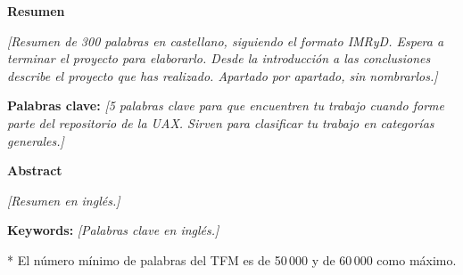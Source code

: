 \cleardoublepage
\thispagestyle{fancy}
{}

\begin{center}\huge \textbf{Resumen}\end{center}

\vspace{1em}

\textit{[Resumen de 300 palabras en castellano, siguiendo el formato IMRyD. Espera a terminar el proyecto para elaborarlo. Desde la introducción a las conclusiones describe el proyecto que has realizado. Apartado por apartado, sin nombrarlos.]}

\vspace{2em}

\noindent\textbf{Palabras clave:} \textit{[5 palabras clave para que encuentren tu trabajo cuando forme parte del repositorio de la UAX. Sirven para clasificar tu trabajo en categorías generales.]}

\cleardoublepage

\thispagestyle{fancy}
{}

\begin{center}\huge \textbf{Abstract}\end{center}

\vspace{1em}

\textit{[Resumen en inglés.]}

\vspace{2em}

\noindent\textbf{Keywords:} \textit{[Palabras clave en inglés.]}

\vspace{2em}

\noindent\small{* El número mínimo de palabras del TFM es de 50\,000 y de 60\,000 como máximo.}

\cleardoublepage
